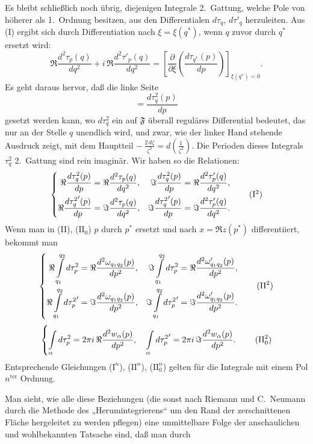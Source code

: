 \documentclass{article}
\begin{document}
Es bleibt schließlich noch übrig, diejenigen Integrale 2.\ Gattung, welche Pole von höherer als 1.\ Ordnung besitzen, aus den Differentialen $d\tau_q$, $d\tau'_q$ herzuleiten. Aus (I) ergibt sich durch Differentiation nach $\xi = \xi(q^*)$, wenn $q$ zuvor durch $q^*$ ersetzt wird:
\[ \Re \frac{d^2\tau_p(q)}{dq^2} + i\,\Re \frac{d^2\tau'_p(q)}{dq^2} = \left[ \frac{\partial}{\partial\xi} \left( \frac{d\tau_{q^*}(p)}{dp} \right) \right]_{\xi(q^*) = 0}. \]
Es geht daraus hervor, daß die linke Seite
\[ = \frac{d\tau_q^2(p)}{dp} \]
gesetzt werden kann, wo $d\tau_q^2$ ein auf $\mathfrak{F}$ überall reguläres Differential bedeutet, das nur an der Stelle $q$ unendlich wird, und zwar, wie der linker Hand stehende Ausdruck zeigt, mit dem Hauptteil $-\,\frac{2\,d\zeta}{\zeta^3} = d\left(\frac{1}{\zeta^2}\right)$. Die Perioden dieses Integrals $\tau_q^2$ 2.\ Gattung sind rein imaginär. Wir haben so die Relationen:
\[ \left\{ \begin{aligned}
\Re \frac{d\tau_q^2(p)}{dp} &= \Re \frac{d^2\tau_p(q)}{dq^2}, & \Im \frac{d\tau_q^2(p)}{dp} &= \Re \frac{d^2\tau'_p(q)}{dq^2}, \\
\Re \frac{d{\tau_q^2}'(p)}{dp} &= \Im \frac{d^2\tau_p(q)}{dq^2}, & \Im \frac{d{\tau_q^2}'(p)}{dp} &= \Im \frac{d^2\tau'_p(q)}{dq^2}.
\end{aligned} \right. \tag{$\mathrm{I}^2$} \]
Wenn man in (II), ($\mathrm{II}_0$) $p$ durch $p^*$ ersetzt und nach $x = \Re z(p^*)$ differentiiert, bekommt man
\[ \left\{ \begin{aligned}
\Re \int\limits_{q_1}^{q_2} d\tau_p^2 &= \Re \frac{d^2\omega_{q_1 q_2}(p)}{dp^2}, & \Im \int\limits_{q_1}^{q_2} d\tau_p^2 &= \Re \frac{d^2\omega'_{q_1 q_2}(p)}{dp^2}, \\
\Re \int\limits_{q_1}^{q_2} d{\tau_p^2}' &= \Im \frac{d^2\omega_{q_1 q_2}(p)}{dp^2}, & \Im \int\limits_{q_1}^{q_2} d{\tau_p^2}' &= \Im \frac{d^2\omega'_{q_1 q_2}(p)}{dp^2}.
\end{aligned} \right. \tag{$\mathrm{II}^2$} \]
\[ \left\{ \int\limits_\alpha d\tau_p^2 = 2\pi i\,\Re \frac{d^2 w_\alpha(p)}{dp^2}, \quad \int\limits_\alpha d{\tau_p^2}' = 2\pi i\,\Im \frac{d^2 w_\alpha(p)}{dp^2}. \right. \tag{$\mathrm{II}_0^2$} \]
Entsprechende Gleichungen ($\mathrm{I}^n$), ($\mathrm{II}^n$), ($\mathrm{II}_0^n$) gelten für die Integrale mit einem Pol $n^{\text{ter}}$ Ordnung.

Man sieht, wie alle diese Beziehungen (die sonst nach Riemann und C.~Neumann durch die Methode des „Herumintegrierens“ um den Rand der zerschnittenen Fläche hergeleitet zu werden pflegen) eine unmittelbare Folge der anschaulichen und wohlbekannten Tatsache sind, daß man durch
\end{document}
